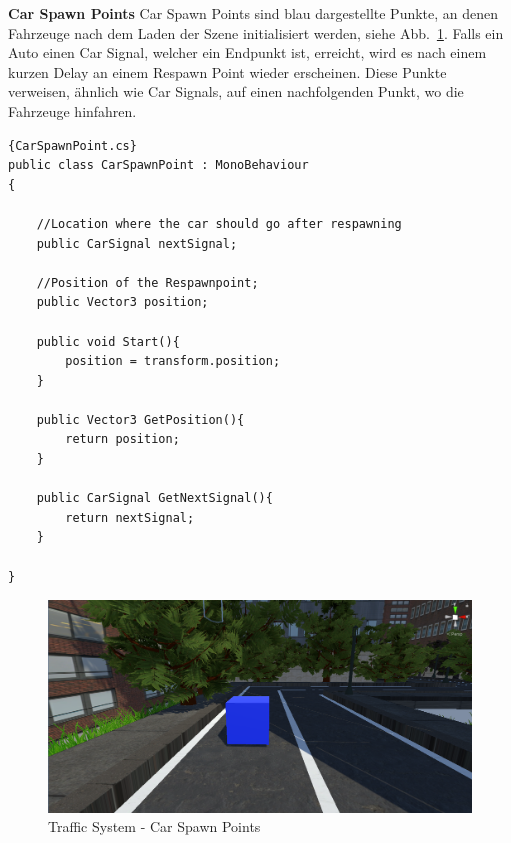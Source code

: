\textbf{Car Spawn Points}
Car Spawn Points sind blau dargestellte Punkte, an denen Fahrzeuge nach dem Laden der Szene initialisiert werden, siehe Abb.~\ref{fig:trafficsystem_car_spawn_points}.
Falls ein Auto einen Car Signal, welcher ein Endpunkt ist, erreicht, wird es nach einem kurzen Delay an einem Respawn Point wieder erscheinen.
Diese Punkte verweisen, \"ahnlich wie Car Signals, auf einen nachfolgenden Punkt, wo die Fahrzeuge hinfahren.

\begin{lstlisting}{CarSpawnPoint.cs}
public class CarSpawnPoint : MonoBehaviour
{

    //Location where the car should go after respawning
    public CarSignal nextSignal;

    //Position of the Respawnpoint;
    public Vector3 position;

    public void Start(){
        position = transform.position;
    }

    public Vector3 GetPosition(){
        return position;
    }

    public CarSignal GetNextSignal(){
        return nextSignal;
    }

}
\end{lstlisting}

\begin{figure}
    \centering
    \includegraphics[scale=0.4]{pics/trafficsystem_respawn_point}
    \caption{Traffic System - Car Spawn Points}
    \label{fig:trafficsystem_car_spawn_points}
\end{figure}


